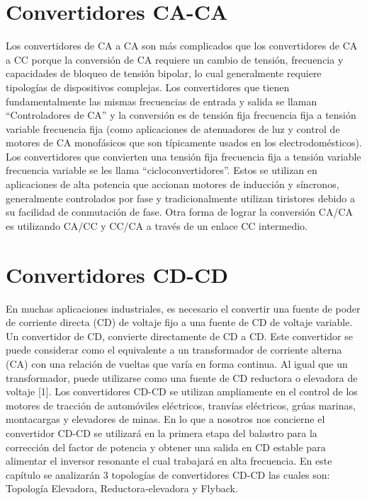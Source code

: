 \documentclass[12pt]{article}
\begin{document}
\section{Convertidores CA-CA}
Los convertidores de CA a CA son más complicados que los convertidores de CA a CC porque la conversión de CA requiere un cambio de tensión, frecuencia y capacidades de bloqueo de tensión bipolar, lo cual generalmente requiere tipologías de dispositivos complejas. Los convertidores que tienen fundamentalmente las mismas frecuencias de entrada y salida se llaman “Controladores de CA” y la conversión es de tensión fija frecuencia fija a tensión variable frecuencia fija (como aplicaciones de atenuadores de luz y control de motores de CA monofásicos que son típicamente usados en los electrodomésticos). Los convertidores que convierten una tensión fija frecuencia fija a tensión variable frecuencia variable se les llama “cicloconvertidores”. Estos se utilizan en aplicaciones de alta potencia que accionan motores de inducción y síncronos, generalmente controlados por fase y tradicionalmente utilizan tiristores debido a su facilidad de conmutación de fase. Otra forma de lograr la conversión CA/CA es utilizando CA/CC y CC/CA a través de un enlace CC intermedio.
\section{Convertidores CD-CD}
En muchas aplicaciones industriales, es necesario el convertir una fuente de
poder de corriente directa (CD) de voltaje fijo a una fuente de CD de voltaje variable. Un
convertidor de CD, convierte directamente de CD a CD. Este convertidor se puede considerar
como el equivalente a un transformador de corriente alterna (CA) con una relación de vueltas
que varía en forma continua. Al igual que un transformador, puede utilizarse como una fuente
de CD reductora o elevadora de voltaje [1].
Los convertidores CD-CD se utilizan ampliamente en el control de los motores de tracción de
automóviles eléctricos, tranvías eléctricos, grúas marinas, montacargas y elevadores de minas.
En lo que a nosotros nos concierne el convertidor CD-CD se utilizará en la primera etapa del
balastro para la corrección del factor de potencia y obtener una salida en CD estable para
alimentar el inversor resonante el cual trabajará en alta frecuencia. En este capítulo se
analizarán 3 topologías de convertidores CD-CD las cuales son: Topología Elevadora,
Reductora-elevadora y Flyback.
\end{document}
